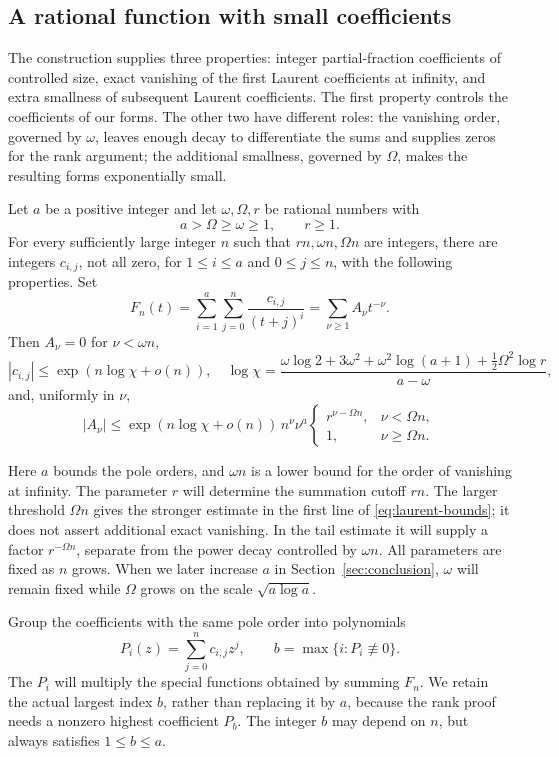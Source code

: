 \subsection{A rational function with small coefficients}

The construction supplies three properties: integer partial-fraction
coefficients of controlled size, exact vanishing of the first Laurent
coefficients at infinity, and extra smallness of subsequent Laurent
coefficients. The first property controls the coefficients of our forms.
The other two have different roles: the vanishing order, governed by
$\omega$, leaves enough decay to differentiate the sums and supplies
zeros for the rank argument; the additional smallness, governed by
$\Omega$, makes the resulting forms exponentially small.

\begin{proposition}[{\cite[Theorem~4]{F26}}]\label{prop:rational}
Let $a$ be a positive integer and let $\omega,\Omega,r$ be rational
numbers with
\[
 a>\Omega\geq\omega\geq1,\qquad r\geq1.
\]
For every sufficiently large integer $n$ such that $rn,\omega n,\Omega n$
are integers, there are integers $c_{i,j}$, not all zero, for
$1\leq i\leq a$ and $0\leq j\leq n$, with the following properties.
Set
\[
 F_n(t)=\sum_{i=1}^a\sum_{j=0}^n\frac{c_{i,j}}{(t+j)^i}
       =\sum_{\nu\geq1}A_\nu t^{-\nu}.
\]
Then $A_\nu=0$ for $\nu<\omega n$,
\begin{equation}\label{eq:coeff-small}
 |c_{i,j}|\leq \exp(n\log\chi+o(n)),
 \quad
 \log\chi=
 \frac{\omega\log2+3\omega^2+\omega^2\log(a+1)
                +\frac12\Omega^2\log r}{a-\omega},
\end{equation}
and, uniformly in $\nu$,
\begin{equation}\label{eq:laurent-bounds}
 |A_\nu|\leq \exp(n\log\chi+o(n))\,n^\nu\nu^a
 \begin{cases}
 r^{\nu-\Omega n},&\nu<\Omega n,\\
 1,&\nu\geq\Omega n.
 \end{cases}
\end{equation}
\end{proposition}

Here $a$ bounds the pole orders, and $\omega n$ is a lower bound for
the order of vanishing at infinity. The parameter $r$ will determine
the summation cutoff $rn$.
The larger threshold $\Omega n$ gives the stronger estimate in the first
line of \eqref{eq:laurent-bounds}; it does not assert additional exact
vanishing. In the tail estimate it will supply a factor $r^{-\Omega n}$,
separate from the power decay controlled by $\omega n$.
All parameters are fixed as $n$ grows. When we later increase $a$ in
Section~\ref{sec:conclusion}, $\omega$ will remain fixed while $\Omega$
grows on the scale $\sqrt{a\log a}$.

Group the coefficients with the same pole order into polynomials
\[
 P_i(z)=\sum_{j=0}^n c_{i,j}z^j,
 \qquad b=\max\{i:P_i\not\equiv0\}.
\]
The $P_i$ will multiply the special functions obtained by summing $F_n$.
We retain the actual largest index $b$, rather than replacing it by $a$,
because the rank proof needs a nonzero highest coefficient $P_b$.
The integer $b$ may depend on $n$, but always satisfies $1\leq b\leq a$.
